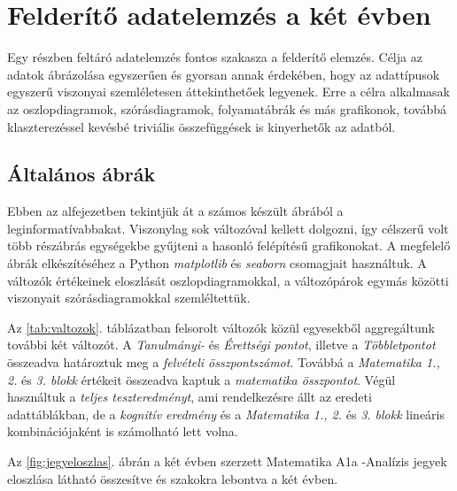 \documentclass[12pt]{article}
\begin{document}
\newpage

\section{Felderítő adatelemzés a két évben}

Egy részben feltáró adatelemzés fontos szakasza a felderítő elemzés. Célja az adatok ábrázolása egyszerűen és gyorsan annak érdekében, hogy az adattípusok egyszerű viszonyai szemléletesen áttekinthetőek legyenek. Erre a célra alkalmasak az oszlopdiagramok, szórásdiagramok, folyamatábrák és más grafikonok, továbbá klaszterezéssel kevésbé triviális összefüggések is kinyerhetők az adatból.

\subsection{Általános ábrák}
\label{ssec:altalanos}

Ebben az alfejezetben tekintjük át a számos készült ábrából a leginformatívabbakat. Viszonylag sok változóval kellett dolgozni, így célszerű volt több részábrás egységekbe gyűjteni a hasonló felépítésű grafikonokat. A megfelelő ábrák elkészítéséhez a Python \emph{matplotlib} és \emph{seaborn} csomagjait használtuk. A változók értékeinek eloszlását oszlopdiagramokkal, a változópárok egymás közötti viszonyait szórásdiagramokkal szemléltettük.

Az \ref{tab:valtozok}. táblázatban felsorolt változók közül egyesekből aggregáltunk további két változót. A \emph{Tanulmányi-} és \emph{Érettségi pontot}, illetve a \emph{Többletpontot} összeadva határoztuk meg a \emph{felvételi összpontszámot}. Továbbá a \emph{Matematika 1., 2.} és \emph{3. blokk} értékeit összeadva kaptuk a \emph{matematika összpontot}. Végül használtuk a \emph{teljes teszteredményt}, ami rendelkezésre állt az eredeti adattáblákban, de a \emph{kognitív eredmény} és a \emph{Matematika 1., 2.} és \emph{3. blokk} lineáris kombinációjaként is számolható lett volna.



Az \ref{fig:jegyeloszlas}. ábrán a két évben szerzett Matematika A1a -Analízis jegyek eloszlása látható összesítve és szakokra lebontva a két évben. 
\end{document}
